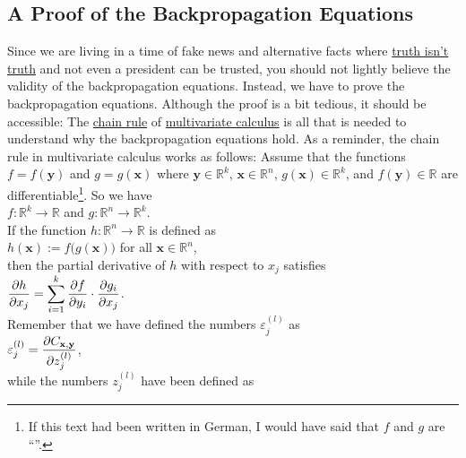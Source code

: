 \subsection{A Proof of the Backpropagation Equations}
Since we are living in a time of fake news and alternative facts where
\href{https://www.theguardian.com/us-news/2018/aug/19/truth-isnt-truth-rudy-giuliani-trump-alternative-facts-orwellian}{truth isn't truth} 
and not even a president can be trusted,  you should not lightly believe the validity of the backpropagation equations.  Instead, 
we have to prove the backpropagation equations.  Although the proof is a bit tedious, it should be accessible: The
\href{https://en.wikipedia.org/wiki/Chain_rule}{chain rule}  of
\href{https://en.wikipedia.org/wiki/Multivariable_calculus}{multivariate calculus} is all that is needed to  
understand why the backpropagation equations hold.  As a reminder, the chain rule in multivariate calculus
works as follows: Assume that the functions $f = f(\mathbf{y})$ and $g = g(\mathbf{x})$ where $\mathbf{y} \in \mathbb{R}^k$,
$\mathbf{x} \in \mathbb{R}^n$,  $g(\mathbf{x}) \in \mathbb{R}^k$, and $f(\mathbf{y}) \in \mathbb{R}$ are
differentiable\footnote{
  If this text had been written in German, I would have said that $f$ and $g$ are ``''.
}.  So we have
\\[0.2cm]
\hspace*{1.3cm}
$f: \mathbb{R}^k \rightarrow \mathbb{R}$ \quad and \quad
$g: \mathbb{R}^n \rightarrow \mathbb{R}^k$. 
\\[0.2cm]
If the function $h: \mathbb{R}^n \rightarrow \mathbb{R}$ is defined as
\\[0.2cm]
\hspace*{1.3cm}
$h(\mathbf{x}) := f\bigl(g(\mathbf{x})\bigr)$ \quad for all $\mathbf{x} \in \mathbb{R}^n$,
\\[0.2cm]
then the partial derivative of $h$ with respect to $x_j$ satisfies
\\[0.2cm]
\hspace*{1.3cm}
$\displaystyle \frac{\partial h}{\partial x_j} = 
 \sum\limits_{i=1}^k \frac{\partial f}{\partial y_i} \cdot \frac{\partial g_i}{\partial x_j}
$.
\\[0.2cm]
Remember that we have defined the numbers $\varepsilon_j^{(l)}$ as
\\[0.2cm]
\hspace*{1.3cm}
$\displaystyle\varepsilon_j^{(l)} = \frac{\partial C_{\mathbf{x}, \mathbf{y}}}{\partial z_j^{(l)}}$,
\\[0.2cm]
while the numbers $z_j^{(l)}$ have been defined as
